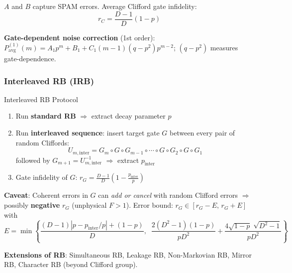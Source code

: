 \documentclass[10pt,a4paper]{article}
\begin{document}
$A$ and $B$ capture SPAM errors. \textcolor{alertred}{Average Clifford gate infidelity}:
\begin{equation}
  \boxed{r_C = \frac{D-1}{D}(1-p)}
\end{equation}

\textbf{Gate-dependent noise correction} (1st order):
$P_{\mathrm{avg}}^{(1)}(m) = A_1 p^m + B_1 + C_1(m-1)(q - p^2)p^{m-2}$; $(q-p^2)$ measures gate-dependence.

\subsubsection{Interleaved RB (IRB)}

\begin{algorithmbox}{Interleaved RB Protocol}
\begin{enumerate}
  \item Run \textbf{standard RB} $\Rightarrow$ extract decay parameter $p$
  \item Run \textbf{interleaved sequence}: insert target gate $G$ between every pair of random Cliffords:
  \[
    U_{m,\mathrm{inter}} = G_m \circ G \circ G_{m-1} \circ \cdots \circ G \circ G_2 \circ G \circ G_1
  \]
  followed by $G_{m+1} = U_{m,\mathrm{inter}}^{-1}$ $\Rightarrow$ extract $p_{\mathrm{inter}}$
  \item \textcolor{alertred}{Gate infidelity of $G$}: $r_G = \frac{D-1}{D}\left(1 - \frac{p_{\mathrm{inter}}}{p}\right)$
\end{enumerate}
\end{algorithmbox}

\textcolor{alertred}{\textbf{Caveat}}: Coherent errors in $G$ can \emph{add or cancel} with random Clifford errors $\Rightarrow$ possibly \textbf{negative} $r_G$ (unphysical $F > 1$). Error bound: $r_G \in [r_G - E, \, r_G + E]$ with
\[
E = \min\!\left\{\frac{(D-1)|p - p_{\mathrm{inter}}/p| + (1-p)}{D},\;\; \frac{2(D^2-1)(1-p)}{pD^2} + \frac{4\sqrt{1-p}\;\sqrt{D^2-1}}{pD^2}\right\}
\]

\textbf{Extensions of RB}: Simultaneous RB, Leakage RB, Non-Markovian RB, Mirror RB, Character RB (beyond Clifford group).
\end{document}
